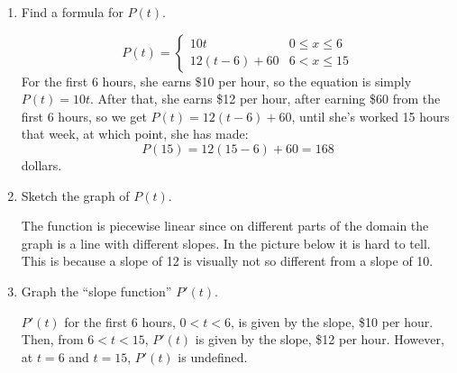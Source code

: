 \documentclass{article}
\begin{document}
\begin{enumerate}
  \begin{enumerate}

  \item
    \begin{problem}[\vfill]
      Find a formula for $P(t)$.
    \end{problem}

    \begin{solution}
      \[
        P(t)=
        \begin{cases}
          10t & 0 \leq x \leq 6\\
          12(t-6)+60& 6< x \leq 15  
        \end{cases}
      \]For the first 6 hours, she earns \$10 per hour, so the equation is simply $P(t) = 10t$. After that, she earns \$12 per hour, after earning \$60 from the first 6 hours, so we get $P(t) = 12(t-6) + 60$, until she's worked 15 hours that week, at which point, she has made:
      $$P(15) = 12(15-6) + 60 = 168$$
      dollars.
    \end{solution}

  \item
    \begin{problem}[\vfill]
      Sketch the graph of $P(t)$.
    \end{problem}

    \begin{solution}  The function is piecewise linear
      since on different parts of the domain the graph is a line with
      different slopes. In the picture below it is hard to tell. This is
      because a slope of 12 is visually not so different from a slope of
      10. 


    \end{solution} 

  \item
    \begin{problem}[\vfill]
      Graph the ``slope function'' $P'(t)$. 
    \end{problem}

    \begin{solution}
      $P'(t)$ for the first 6 hours, 
      $0 < t < 6$, is given by the slope, \$10 per hour. Then, from
      $6<t<15$, $P'(t)$ is given by the slope, \$12 per hour. However, 
      at $t = 6$ and $t = 15$, $P'(t)$ is undefined.  


\end{solution}
\end{enumerate}
\end{enumerate}
\end{document}
